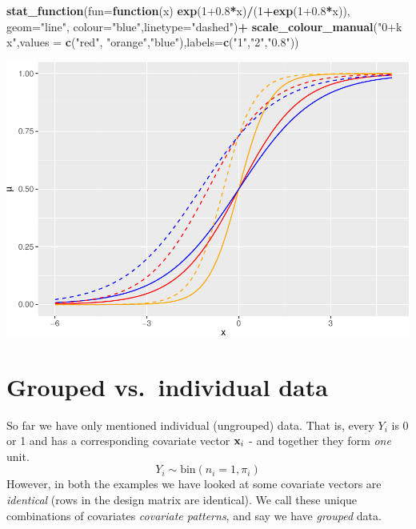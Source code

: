 \documentclass[
]{article}
\newenvironment{Shaded}{\begin{snugshade}}{\end{snugshade}}
\newcommand{\AttributeTok}[1]{\textcolor[rgb]{0.13,0.29,0.53}{#1}}
\newcommand{\ControlFlowTok}[1]{\textcolor[rgb]{0.13,0.29,0.53}{\textbf{#1}}}
\newcommand{\DecValTok}[1]{\textcolor[rgb]{0.00,0.00,0.81}{#1}}
\newcommand{\FloatTok}[1]{\textcolor[rgb]{0.00,0.00,0.81}{#1}}
\newcommand{\FunctionTok}[1]{\textcolor[rgb]{0.13,0.29,0.53}{\textbf{#1}}}
\newcommand{\NormalTok}[1]{#1}
\newcommand{\SpecialCharTok}[1]{\textcolor[rgb]{0.81,0.36,0.00}{\textbf{#1}}}
\newcommand{\StringTok}[1]{\textcolor[rgb]{0.31,0.60,0.02}{#1}}
\begin{document}
\begin{Shaded}
\begin{Highlighting}[]
          \FunctionTok{stat\_function}\NormalTok{(}\AttributeTok{fun=}\ControlFlowTok{function}\NormalTok{(x) }\FunctionTok{exp}\NormalTok{(}\DecValTok{1}\FloatTok{+0.8}\SpecialCharTok{*}\NormalTok{x)}\SpecialCharTok{/}\NormalTok{(}\DecValTok{1}\SpecialCharTok{+}\FunctionTok{exp}\NormalTok{(}\DecValTok{1}\FloatTok{+0.8}\SpecialCharTok{*}\NormalTok{x)), }\AttributeTok{geom=}\StringTok{"line"}\NormalTok{, }\AttributeTok{colour=}\StringTok{"blue"}\NormalTok{,}\AttributeTok{linetype=}\StringTok{"dashed"}\NormalTok{)}\SpecialCharTok{+}
  \FunctionTok{scale\_colour\_manual}\NormalTok{(}\StringTok{"0+k x"}\NormalTok{,}\AttributeTok{values =} \FunctionTok{c}\NormalTok{(}\StringTok{"red"}\NormalTok{, }\StringTok{"orange"}\NormalTok{,}\StringTok{"blue"}\NormalTok{),}\AttributeTok{labels=}\FunctionTok{c}\NormalTok{(}\StringTok{"1"}\NormalTok{,}\StringTok{"2"}\NormalTok{,}\StringTok{"0.8"}\NormalTok{))}
\end{Highlighting}
\end{Shaded}

\includegraphics{3BinReg_files/figure-latex/unnamed-chunk-12-1.pdf}

\hypertarget{grouped-vs.-individual-data}{%
\section{Grouped vs.~individual
data}\label{grouped-vs.-individual-data}}

So far we have only mentioned individual (ungrouped) data. That is,
every \(Y_i\) is 0 or 1 and has a corresponding covariate vector
\({\bf x}_i\) - and together they form \emph{one} unit.
\[Y_i \sim \text{bin}(n_i=1,\pi_i)\] However, in both the examples we
have looked at some covariate vectors are \emph{identical} (rows in the
design matrix are identical). We call these unique combinations of
covariates \emph{covariate patterns}, and say we have \emph{grouped}
data.
\end{document}
